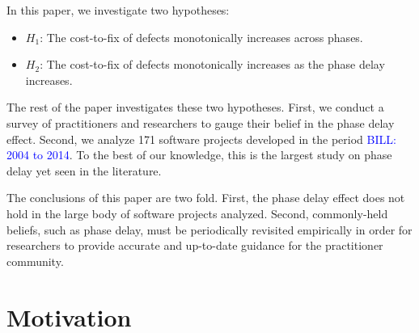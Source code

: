 \documentclass{sig-alternate}
\newcommand{\bill}[1]{\textcolor{blue}{BILL: #1}}
\newcommand{\bi}{\begin{itemize}[leftmargin=0.4cm]}
\newcommand{\ei}{\end{itemize}}
\newcommand{\be}{\begin{enumerate}}
\newcommand{\ee}{\end{enumerate}}
\begin{document}

In this paper, we investigate two hypotheses:

\bi
    \item $H_1$: The cost-to-fix of defects monotonically increases across phases.
    \item $H_2$: The cost-to-fix of defects monotonically increases as the phase delay increases.
\ei
The rest of the paper investigates these two hypotheses. First, we conduct a survey of practitioners and researchers to gauge their belief in the phase delay effect. Second, we  analyze 171 software  projects developed in the period \bill{2004 to 2014}.  To the best of our knowledge, this is the largest study on phase delay yet seen in the literature.




 
 
The conclusions of this paper are two fold. First, the phase delay effect does not hold in the large body of software projects analyzed. Second, commonly-held beliefs, such as phase delay, must be periodically revisited empirically in order for researchers to provide accurate and up-to-date guidance for the practitioner community.



\section{Motivation}
\end{document}

